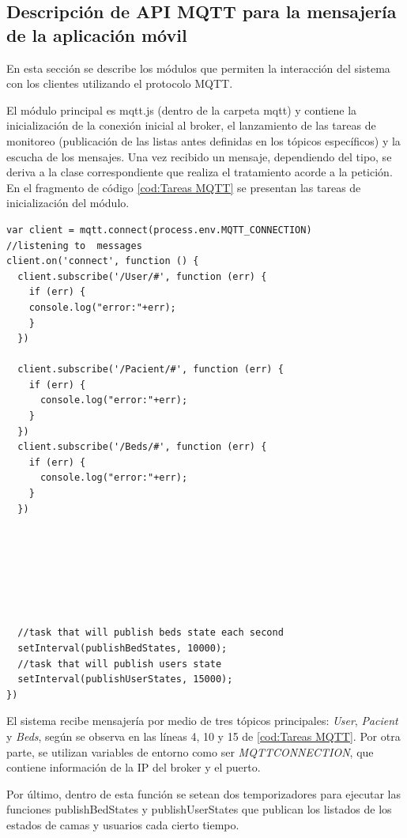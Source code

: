 \subsection{Descripción de API MQTT para la mensajería de la aplicación móvil}

En esta sección se describe los módulos que permiten la interacción del sistema con los clientes utilizando el protocolo MQTT.


El módulo principal es mqtt.js (dentro de la carpeta mqtt) y contiene la inicialización de la conexión inicial al broker, el lanzamiento de las tareas de monitoreo (publicación de las listas antes definidas en los tópicos específicos) y la escucha de los mensajes. Una vez recibido un mensaje, dependiendo del tipo, se deriva a la clase correspondiente que realiza el tratamiento acorde a la petición. En el fragmento de código  \ref{cod:Tareas MQTT} se presentan las tareas de inicialización del módulo.



\begin{lstlisting}[label=cod:Tareas MQTT,caption=  Tareas ejecutadas por mqtt.js.]
var client = mqtt.connect(process.env.MQTT_CONNECTION)
//listening to  messages
client.on('connect', function () {
  client.subscribe('/User/#', function (err) {
    if (err) {
    console.log("error:"+err);
    }
  })

  client.subscribe('/Pacient/#', function (err) {
    if (err) {      
      console.log("error:"+err);
    }
  })
  client.subscribe('/Beds/#', function (err) {
    if (err) {      
      console.log("error:"+err);
    }
  })







  //task that will publish beds state each second
  setInterval(publishBedStates, 10000);
  //task that will publish users state 
  setInterval(publishUserStates, 15000);
})
\end{lstlisting}

El sistema recibe mensajería por medio de tres tópicos principales: \textit{User}, \textit{Pacient} y \textit{Beds}, según se observa en las líneas 4, 10 y 15 de \ref{cod:Tareas MQTT}. Por otra parte, se utilizan variables de entorno como ser \textit{MQTT\textunderscore CONNECTION}, que contiene información de la IP del broker y el puerto.

Por último, dentro de esta función se setean dos temporizadores para ejecutar las funciones publishBedStates y publishUserStates que publican los listados de los estados de camas y usuarios cada cierto tiempo.




